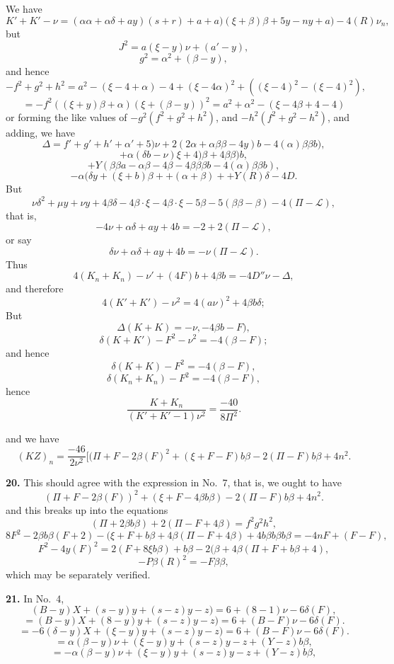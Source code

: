 \documentclass[11pt,a4paper]{book}
\begin{document}
We have
\[
K' + K' - \nu = (\alpha\alpha + \alpha\delta + ay)(s + r) + a + a)(\xi + \beta)\beta + 5y - n y + a) - 4(R)\nu_n,
\]
but
\[
J^2 = a(\xi - y)\nu + (a' - y),
\]
\[
g^2 = \alpha^2 + (\beta - y),
\]
and hence
\[
- f^2 + g^2 + h^2 = a^2 - (\xi - 4 + \alpha) - 4 + (\xi - 4\alpha)^2 + ((\xi - 4)^2 - (\xi - 4)^2),
\]
\[
= - f^2((\xi + y)\beta + \alpha)(\xi + (\beta - y))^2 = a^2 + \alpha^2 - (\xi - 4\beta + 4 - 4)
\]
or forming the like values of $- g^2(f^2 + g^2 + h^2)$, and $- h^2(f^2 + g^2 - h^2)$, and adding, we have
\[
\Delta = f' + g' + h' + \alpha' + 5)\nu + 2(2\alpha + \alpha\beta\beta - 4y)b - 4(\alpha)\beta\beta b),
\]
\[
+ \alpha(\delta b - \nu)\xi + 4)\beta + 4\beta\beta)b,
\]
\[
+ Y(\beta\beta a - \alpha\beta - 4\beta - 4\beta\beta\beta b - 4(\alpha)\beta\beta b),
\]
\[
- \alpha(\delta y + (\xi + b)\beta + + (\alpha + \beta) + + Y(R)\delta - 4D.
\]
But
\[
\nu\delta^2 + \mu y + \nu y + 4\beta\delta - 4\beta \cdot \xi - 4\beta \cdot \xi - 5\beta - 5(\beta\beta - \beta) - 4(\Pi - \mathcal{L}),
\]
that is,
\[
- 4\nu + \alpha\delta + ay + 4b = -2 + 2(\Pi - \mathcal{L}),
\]
or say
\[
\delta\nu + \alpha\delta + ay + 4b = - \nu (\Pi - \mathcal{L}).
\]
Thus
\[
4(K_n + K_n) - \nu' + (4F)b + 4\beta b = - 4D''\nu - \Delta,
\]
and therefore
\[
4(K' + K') - \nu^2 = 4(a\nu)^2 + 4\beta b\delta;
\]
But
\[
\Delta(K + K) = - \nu, - 4\beta b - F),
\]
\[
\delta(K + K') - F^2 - \nu^2 = - 4(\beta - F);
\]
and hence
\[
\delta(K + K) - F^2 = - 4(\beta - F),
\]
\[
\delta(K_n + K_n) - F^2 = - 4(\beta - F),
\]
hence
\[
\frac{K + K_n}{(K' + K' - 1)\nu^2} = \frac{-40}{8\Pi^2}.
\]

and we have
\[
(KZ)_n = \frac{-46}{2\nu^2}[(\Pi + F - 2\beta(F)^2 + (\xi + F - F)b\beta - 2(\Pi - F)b\beta + 4n^2.
\]

\textbf{20.} This should agree with the expression in No.\ 7, that is, we ought to have
\[
(\Pi + F - 2\beta(F))^2 + (\xi + F - 4\beta b\beta) - 2(\Pi - F)b\beta + 4n^2.
\]
and this breaks up into the equations
\[
(\Pi + 2\beta b\beta) + 2(\Pi - F + 4\beta) = f^2 g^2 h^2,
\]
\[
8F^2 - 2\beta b\beta(F + 2) - (\xi + F + b\beta + 4\beta(\Pi - F + 4\beta) + 4b\beta b\beta b\beta = - 4nF + (F - F),
\]
\[
F^2 - 4y(F)^2 = 2(F + 8\xi b\beta) + b\beta - 2(\beta + 4\beta(\Pi + F + b\beta + 4),
\]
\[
- P\beta(R)^2 = - F\beta\beta,
\]
which may be separately verified.

\textbf{21.} In No.\ 4,
\[
(B - y)X + (s - y)y + (s - z)y - z) = 6 + (8 - 1)\nu - 6\delta(F),
\]
\[
= (B - y)X + (8 - y)y + (s - z)y - z) = 6 + (B - F)\nu - 6\delta(F).
\]
\[
= - 6(\delta - y)X + (\xi - y)y + (s - z)y - z) = 6 + (B - F)\nu - 6\delta(F).
\]
\[
= \alpha(\beta - y)\nu + (\xi - y)y + (s - z)y - z + (Y - z)b\beta,
\]
\[
= -\alpha(\beta - y)\nu + (\xi - y)y + (s - z)y - z + (Y - z)b\beta,
\]
\end{document}
